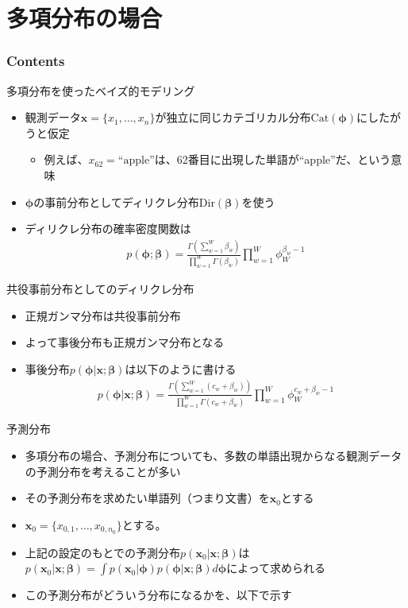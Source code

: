 \documentclass[aspectratio=169,unicode,dvipdfmx,14pt]{beamer}
\begin{document}
\section{多項分布の場合}

\begin{frame}\frametitle{Contents}
\Large \tableofcontents[currentsection]
\end{frame}

\begin{frame}{多項分布を使ったベイズ的モデリング}
\begin{itemize}
\item 観測データ$\bm{x}=\{x_1,\ldots,x_n\}$が独立に同じカテゴリカル分布$\mbox{Cat}(\bm{\phi})$にしたがうと仮定
\begin{itemize}
\item 例えば、$x_{62} = \mbox{``apple''}$は、62番目に出現した単語が``apple''だ、という意味
\end{itemize}
\item $\bm{\phi}$の事前分布としてディリクレ分布$\mbox{Dir}(\bm{\beta})$を使う
\item ディリクレ分布の確率密度関数は
\begin{align}
p(\bm{\phi}; \bm{\beta}) = \frac{\Gamma(\sum_{w=1}^W \beta_w)}{\prod_{w=1}^W \Gamma(\beta_w)}
\prod_{w=1}^W \phi_W^{\beta_w - 1}
\end{align}
\end{itemize}
\end{frame}

\begin{frame}{共役事前分布としてのディリクレ分布}
\begin{itemize}
\item 正規ガンマ分布は共役事前分布
\item よって事後分布も正規ガンマ分布となる
\item 事後分布$p(\bm{\phi}|\bm{x}; \bm{\beta})$は以下のように書ける
\begin{align}
p(\bm{\phi}|\bm{x}; \bm{\beta}) = 
\frac{\Gamma(\sum_{w=1}^W (c_w + \beta_w))}{\prod_{w=1}^W \Gamma(c_w + \beta_w)}
\prod_{w=1}^W \phi_W^{c_w + \beta_w - 1}
\end{align}
\end{itemize}
\end{frame}

\begin{frame}{予測分布}
\begin{itemize}
\item 多項分布の場合、予測分布についても、多数の単語出現からなる観測データの予測分布を考えることが多い
\item その予測分布を求めたい単語列（つまり文書）を$\bm{x}_0$とする
\item $\bm{x}_0 = \{x_{0,1}, \ldots, x_{0,n_0}\}$とする。
\item 上記の設定のもとでの予測分布$p(\bm{x}_0 | \bm{x};\bm{\beta})$は
$p(\bm{x}_0|\bm{x};\bm{\beta}) = \int p(\bm{x}_0|\bm{\phi})p(\bm{\phi}|\bm{x};\bm{\beta}) d\bm{\phi}$によって求められる
\item この予測分布がどういう分布になるかを、以下で示す
\end{itemize}
\end{frame}
\end{document}
